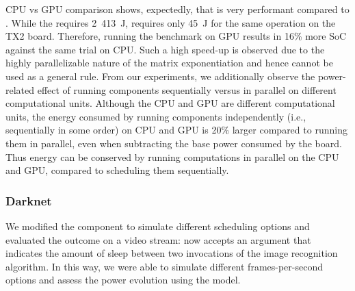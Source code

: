 CPU vs GPU comparison shows, expectedly, that  is very performant compared to . While the  requires 2~413~J,  requires only 45~J for the same operation on the TX2 board. Therefore, running the benchmark on GPU results in 16\% more SoC against the same trial on CPU. Such a high speed-up is observed due to the highly parallelizable nature of the matrix exponentiation and hence cannot be used as a general rule. From our experiments, we additionally observe the power-related effect of running components sequentially versus in parallel on different computational units. Although the CPU and GPU are different computational units, the energy consumed by running components independently (i.e., sequentially in some order) on CPU and GPU is 20\% larger compared to running them in parallel, even when subtracting the base power consumed by the board. Thus %
energy can be conserved by running computations in parallel on the CPU and GPU, compared to scheduling them sequentially.


\subsubsection*{\color{cyan}Darknet}
\label{sec:experimental-results:darknet}

We modified the  component to simulate different scheduling options and evaluated the outcome on a video stream:  now %
accepts an argument that indicates the amount of sleep between two invocations of the image recognition algorithm. In this way, we were able to simulate different frames-per-second options and assess the power evolution using the model. %

